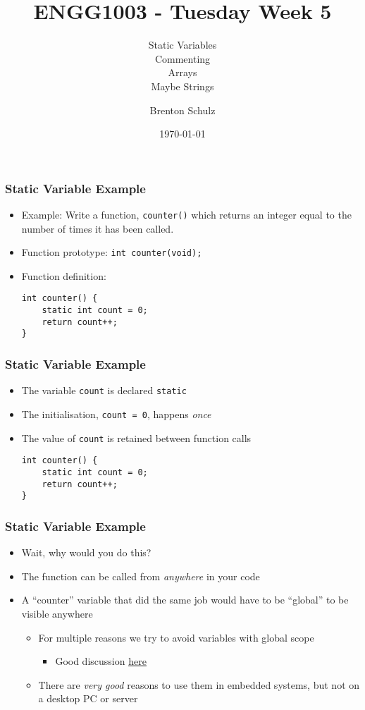 \documentclass[14pt]{beamer}
\title{ENGG1003 - Tuesday Week 5}
\subtitle{Static Variables\\Commenting\\Arrays\\Maybe Strings}
\author{Brenton Schulz}
\institute{University of Newcastle}
\date{\today}
\begin{document}
\titlepage

\begin{frame}[fragile]
\frametitle{Static Variable Example}
\begin{itemize}
\item Example: Write a function, \texttt{counter()} which returns an integer equal to the number of times it has been called.
\pause
\item Function prototype: \texttt{int counter(void);}
\pause
\item Function definition:
\begin{lstlisting}[style=CStyle]
int counter() {
	static int count = 0;
	return count++;
}
\end{lstlisting}
\end{itemize}
\end{frame}

\begin{frame}[fragile]
\frametitle{Static Variable Example}
\begin{itemize}
\item The variable \texttt{count} is declared \texttt{static}
\item The initialisation, \texttt{count = 0}, happens \textit{once}
\item The value of \texttt{count} is retained between function calls 
\begin{lstlisting}[style=CStyle]
int counter() {
	static int count = 0;
	return count++;
}
\end{lstlisting}
\end{itemize}
\end{frame}

\begin{frame}
\frametitle{Static Variable Example}
\begin{itemize}
\item Wait, why would you do this?
\pause
\item The function can be called from \textit{anywhere} in your code
\pause
\item A ``counter'' variable that did the same job would have to be ``global'' to be visible anywhere
	\begin{itemize}
\pause
		\item For multiple reasons we try to avoid variables with global scope
			\begin{itemize}
				\item Good discussion \underline{\href{http://wiki.c2.com/?GlobalVariablesAreBad}{here}}
			\end{itemize}
\pause
		\item There are \textit{very good} reasons to use them in embedded systems, but not on a desktop PC or server
	\end{itemize}
\end{itemize}
\end{frame}
\end{document}
